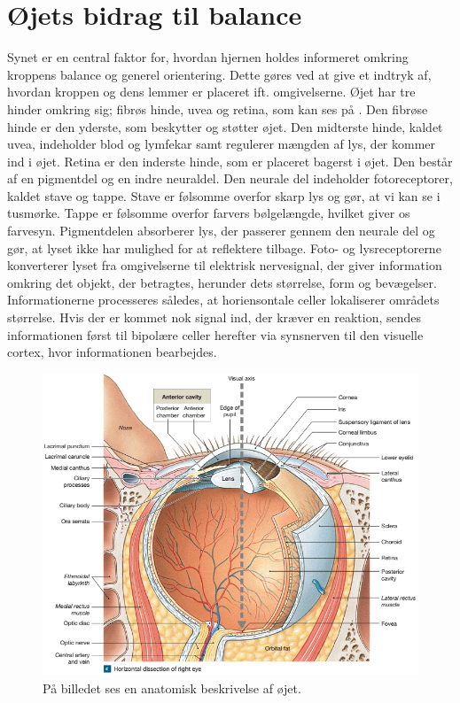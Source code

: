 \section{Øjets bidrag til balance}
Synet er en central faktor for, hvordan hjernen holdes informeret omkring kroppens balance og generel orientering. Dette gøres ved at give et indtryk af, hvordan kroppen og dens lemmer er placeret ift. omgivelserne. Øjet har tre hinder omkring sig; fibrøs hinde, uvea og retina, som kan ses på . Den fibrøse hinde er den yderste, som beskytter og støtter øjet. Den midterste hinde, kaldet uvea, indeholder blod og lymfekar samt regulerer mængden af lys, der kommer ind i øjet. Retina er den inderste hinde, som er placeret bagerst i øjet. Den består af en pigmentdel og en indre neuraldel. Den neurale del indeholder fotoreceptorer, kaldet stave og tappe. Stave er følsomme overfor skarp lys og gør, at vi kan se i tusmørke. Tappe er følsomme overfor farvers bølgelængde, hvilket giver os farvesyn. Pigmentdelen absorberer lys, der passerer gennem den neurale del og gør, at lyset ikke har mulighed for at reflektere tilbage. Foto- og lysreceptorerne konverterer lyset fra omgivelserne til elektrisk nervesignal, der giver information omkring det objekt, der betragtes, herunder dets størrelse, form og bevægelser. Informationerne processeres således, at horiensontale celler lokaliserer områdets størrelse. Hvis der er kommet nok signal ind, der kræver en reaktion, sendes informationen først til bipolære celler herefter via synsnerven til den visuelle cortex, hvor informationen bearbejdes. \cite{Martini2012}     

\begin{figure}[H]
	\centering
	\includegraphics[scale=0.2]{figures/bProblemanalyse/Oejets-anatomi.png}
	\caption{På billedet ses en anatomisk beskrivelse af øjet. \cite{Martini2012}}
	\label{Oejet}
\end{figure}

